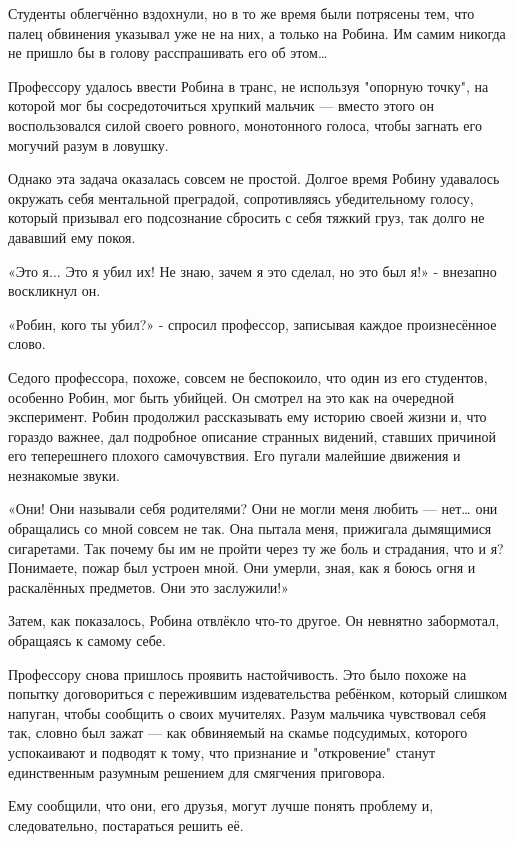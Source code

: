 \documentclass[a4paper,12pt]{book}
\begin{document}
\par
Студенты облегчённо вздохнули, но в то же время были потрясены тем, что палец обвинения указывал уже не на них, а только на Робина. Им самим никогда не пришло бы в голову расспрашивать его об этом…
\par
Профессору удалось ввести Робина в транс, не используя "опорную точку", на которой мог бы сосредоточиться хрупкий мальчик — вместо этого он воспользовался силой своего ровного, монотонного голоса, чтобы загнать его могучий разум в ловушку.
\par
Однако эта задача оказалась совсем не простой. Долгое время Робину удавалось окружать себя ментальной преградой, сопротивляясь убедительному голосу, который призывал его подсознание сбросить с себя тяжкий груз, так долго не дававший ему покоя.
\par
«Это я... Это я убил их! Не знаю, зачем я это сделал, но это был я!» - внезапно воскликнул он.
\par
«Робин, кого ты убил?» - спросил профессор, записывая каждое произнесённое слово.
\par
Седого профессора, похоже, совсем не беспокоило, что один из его студентов, особенно Робин, мог быть убийцей. Он смотрел на это как на очередной эксперимент. Робин продолжил рассказывать ему историю своей жизни и, что гораздо важнее, дал подробное описание странных видений, ставших причиной его теперешнего плохого самочувствия. Его пугали малейшие движения и незнакомые звуки.
\par
«Они! Они называли себя родителями? Они не могли меня любить — нет… они обращались со мной совсем не так. Она пытала меня, прижигала дымящимися сигаретами. Так почему бы им не пройти через ту же боль и страдания, что и я? Понимаете, пожар был устроен мной. Они умерли, зная, как я боюсь огня и раскалённых предметов. Они это заслужили!»
\par
Затем, как показалось, Робина отвлёкло что-то другое. Он невнятно забормотал, обращаясь к самому себе.
\par
Профессору снова пришлось проявить настойчивость. Это было похоже на попытку договориться с пережившим издевательства ребёнком, который слишком напуган, чтобы сообщить о своих мучителях. Разум мальчика чувствовал себя так, словно был зажат — как обвиняемый на скамье подсудимых, которого успокаивают и подводят к тому, что признание и "откровение" станут единственным разумным решением для смягчения приговора.
\par
Ему сообщили, что они, его друзья, могут лучше понять проблему и, следовательно, постараться решить её.
\end{document}
